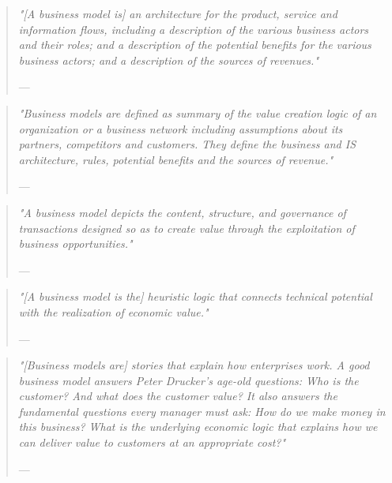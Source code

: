 \begin{quote}{\slshape 
"[A business model is] an architecture for the product, service and information flows, including a description of the various business actors and their roles; and a description of the potential benefits for the various business actors; and a description of the sources of revenues."}
\vspace*{-5pt}
\begin{flushright}
	--- \citet[p. 2]{Timmers1998}
\end{flushright}
\end{quote}

\begin{quote}{\slshape 
"Business models are defined as summary of the value creation logic of an organization or a business network including assumptions about its partners, competitors and customers. They define the business and IS architecture, rules, potential benefits and the sources of revenue."}
\vspace*{-5pt}
\begin{flushright}
	--- \citet[p. 798]{Klueber2000}
\end{flushright}
\end{quote}

\begin{quote}{\slshape 
"A business model depicts the content, structure, and governance of transactions designed so as to create value through the exploitation of business opportunities."}
\vspace*{-5pt}
\begin{flushright}
	--- \citet[p. 511]{Amit2001}
\end{flushright}
\end{quote}

\begin{quote}{\slshape 
"[A business model is the] heuristic logic that connects technical potential with the realization of economic value."}
\vspace*{-5pt}
\begin{flushright}
	--- \citet[p. 529]{Chesbrough2002}
\end{flushright}
\end{quote}

\begin{quote}{\slshape 
"[Business models are] stories that explain how enterprises work. A good business model answers Peter Drucker's age-old questions: Who is the customer? And what does the customer value? It also answers the fundamental questions every manager must ask: How do we make money in this business? What is the underlying economic logic that explains how we can deliver value to customers at an appropriate cost?"}
\vspace*{-5pt}
\begin{flushright}
	--- \citet[p. 2]{Magretta2002}
\end{flushright}
\end{quote}

